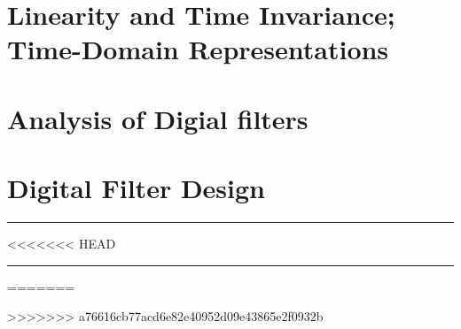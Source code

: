 \documentclass[10pt]{article}
\begin{document}
\newcommand{\josquote}[1]{
    \framebox{
    \parbox{\textwidth}{
    \textit{#1}
    }
    }
}

\newcommand{\paulhint}[1]{
    #1
}

\setlength\parindent{0pt}
\section{Linearity and Time Invariance; Time-Domain Representations}
%
%
%
%
%
\section{Analysis of Digial filters}
%
%
%
%
%
\section{Digital Filter Design}
%
%
%
%
%
%
%
\noindent\rule[0.5ex]{\linewidth}{0.5pt}
<<<<<<< HEAD

\noindent\rule[0.5ex]{\linewidth}{0.5pt}

=======

>>>>>>> a76616cb77acd6e82e40952d09e43865e2f0932b
\end{document}
